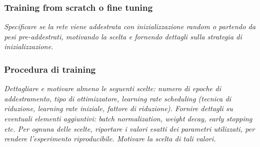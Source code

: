 \subsubsection{Training from scratch o fine tuning}
\emph{Specificare se la rete viene addestrata con inizializzazione random o partendo da pesi pre-addestrati, motivando la scelta e fornendo dettagli sulla strategia di inizializzazione.}

\subsubsection{Procedura di training}
{\em Dettagliare e motivare almeno le seguenti scelte: numero di epoche di addestramento, tipo di ottimizzatore, learning rate scheduling (tecnica di riduzione, learning rate iniziale, fattore di riduzione). Fornire dettagli su eventuali elementi aggiuntivi: batch normalization, weight decay, early stopping etc. Per ognuna delle scelte, riportare i valori esatti dei parametri utilizzati, per rendere l’esperimento riproducibile. Motivare la scelta di tali valori.}